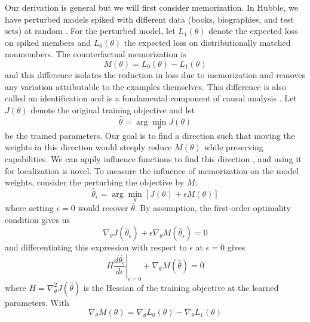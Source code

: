 \documentclass{article}
\begin{document}
Our derivation is general but we will first consider memorization. In Hubble, we have perturbed models spiked with different data (books, biographies, and test sets) at random \cite{wei2026hubble}. For the perturbed model, let \(L_1(\theta)\) denote the expected loss on spiked members and \(L_0(\theta)\) the expected loss on distributionally matched nonmembers. The counterfactual memorization \cite{zhang_2023_counterfactual, feldman_2020_learning} is
\begin{equation}
    M(\theta)
    =
    L_0(\theta)-L_1(\theta)
\end{equation}
and this difference isolates the reduction in loss due to memorization and removes any variation attributable to the examples themselves. This difference is also called an identification and is a fundamental component of causal analysis \cite{angrist_2009_mostly}. Let \(J(\theta)\) denote the original training objective and let
\begin{equation}
    \hat{\theta}
    =
    \arg\min_\theta J(\theta)
\end{equation}
be the trained parameters. Our goal is to find a direction such that moving the weights in this direction would steeply reduce $M(\theta)$ while preserving capabilities. We can apply influence functions to find this direction \cite{koh_understanding_2017}, and using it for localization is novel. To measure the influence of memorization on the model weights, consider the perturbing the objective by $M$:
\begin{equation}
    \hat{\theta}_\epsilon
    =
    \arg\min_\theta
    \left[
        J(\theta)
        +
        \epsilon M(\theta)
    \right]
    \label{eq:perturbed-objective}
\end{equation}
where setting $\epsilon=0$ would recover $\hat{\theta}$. By assumption, the first-order optimality condition gives us
\begin{equation}
    \nabla_\theta J(\hat{\theta}_\epsilon)
    +
    \epsilon
    \nabla_\theta M(\hat{\theta}_\epsilon)
    =
    0
\end{equation}
and differentiating this expression with respect to \(\epsilon\) at \(\epsilon=0\) gives
\begin{equation}
    H
    \left.
    \frac{d\hat{\theta}_\epsilon}{d\epsilon}
    \right|_{\epsilon=0}
    +
    \nabla_\theta M(\hat{\theta})
    =
    0
\end{equation}
where $H=\nabla_\theta^2 J(\hat{\theta})$
is the Hessian of the training objective at the learned parameters. With
\begin{equation}
    \nabla_\theta M(\theta)
    =
    \nabla_\theta L_0(\theta)
    -
    \nabla_\theta L_1(\theta)
    \label{eq:memorization-gradient}
\end{equation}
\end{document}
